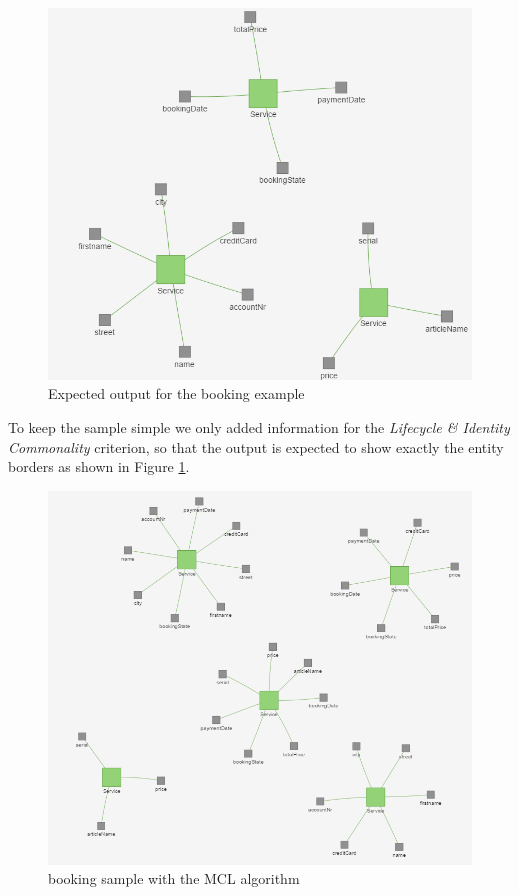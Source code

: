 \begin{figure}[H]
	\begin{center}
		\includegraphics[scale=0.75]{images/booking_entities.png}
	\end{center}
	\caption{Expected output for the booking example}
	\label{fig:bookingExample}
\end{figure}

To keep the sample simple we only added information for the \textit{Lifecycle \& Identity Commonality} criterion, so that the output is expected to show exactly the entity borders as shown in Figure \ref{fig:bookingExample}.


\begin{figure}[H]
	\begin{center}
		\includegraphics[scale=0.7]{images/booking_entities_mcl.png}
	\end{center}
	\caption{booking sample with the MCL algorithm}
	\label{fig:bookingExampleMCL}
\end{figure}

